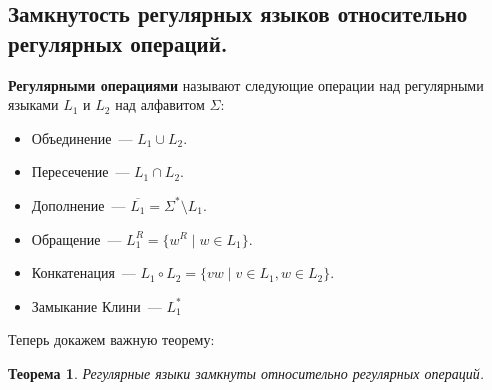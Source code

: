\documentclass[a4paper,12pt]{article}
\newtheorem*{theorem}{Теорема}
\begin{document}
	\subsection{Замкнутость регулярных языков относительно регулярных операций. }
	\textbf{Регулярными операциями} называют следующие операции над регулярными языками \(L_1\) и \(L_2\) над алфавитом \(\Sigma\):
	\begin{itemize}
		\item Объединение~--- \(L_1 \cup L_2\).
		\item Пересечение~--- \(L_1 \cap L_2\).
		\item Дополнение~--- \(\overline{L_1} = \Sigma^* \setminus L_1\).
		\item Обращение~--- \(L_1^R = \{w^R \mid w \in L_1\}\).
		\item Конкатенация~--- \(L_1 \circ L_2 = \{vw \mid v \in L_1, w \in L_2\}\).
		\item Замыкание Клини~--- \(L_1^*\)
	\end{itemize}
	Теперь докажем важную теорему:
	\begin{theorem}
		Регулярные языки замкнуты относительно регулярных операций.
	\end{theorem}
\end{document}
